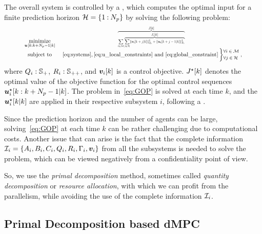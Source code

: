 \documentclass{ifacconf}  %
\begin{document}
The overall system is controlled by a \mpc{}, which
computes the optimal input for a finite prediction horizon ${\mathcal{H}=\{1\mathbin{:}N_{p}\}}$ by solving the following problem:
\begin{equation}\label{eq:GOP}
\resizebox{.88\columnwidth}{!}{$
\begin{matrix}
\underset{\useq}{\mathrm{minimize}}&\resizebox{0.35\textwidth}{!}{$\overbrace{\sum\limits_{i\in\set{M}} \overbrace{\sum_{j\in\set{H}}\norm{\mpcvec{v}[i][k+j][k]}^{2}_{Q_i}+\norm{\mpcvec{u}[i][k+j-1][k]}^{2}_{R_i}}^{\textstyle{} \obji}}^{\textstyle{} \globobj}$}\\
\mathrm{subject~ to}&~\eqref{eq:systems},\eqref{eq:u_local_constraints}\ \mathrm{and}\ \eqref{eq:global_constraint}
\left\}\small
\begin{aligned}
  &\forall i\in\set{M}\\
  &\forall j\in\set{H}
\end{aligned}\right.,

\end{matrix}
  $}
\end{equation}
where ${Q_{i}:\mathbb{S}_{+}}$, ${R_{i}:\mathbb{S}_{++}}$, and $\vik$ is a control objective.
$\optglobobj$ denotes the optimal value of the objective function for the optimal control sequences ${\optuiseq}$.
The problem in~\eqref{eq:GOP} is solved at each time $k$, and the ${\optuikk}$ are applied in their respective subsystem $i$, following a \rhs{}.

Since the prediction horizon and the number of agents can be large, solving~\eqref{eq:GOP} at each time $k$ can be rather challenging due to computational costs.
Another issue that can arise is the fact that the complete information ${\mathcal{I}_i=\{A_i,B_i,C_i,Q_i,R_i,\Gamma_i,\boldsymbol{v}_i\}}$ from all the subsystems is needed to solve the problem,
which can be viewed negatively from a confidentiality point of view.

So, we use the \emph{primal decomposition} method, sometimes called \emph{quantity decomposition} or \emph{resource allocation}, with which we can profit from the parallelism, while avoiding the use of the complete information $\mathcal{I}_{i}$.

\subsection{Primal Decomposition based dMPC}\label{ssec:dMPC}
\end{document}
